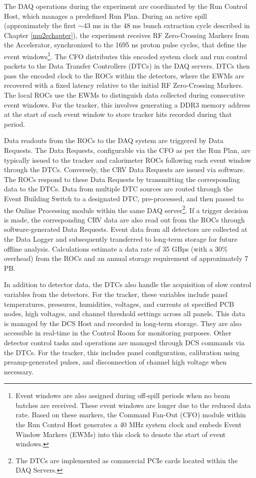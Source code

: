 The DAQ operations during the experiment are coordinated by the Run Control Host, 
which manages a predefined Run Plan. During an active spill (approximately the first $\sim$43 ms in 
the 48 ms bunch extraction cycle described in Chapter \ref{mu2echapter}), 
the experiment receives RF Zero-Crossing Markers from the Accelerator, 
synchronized to the 1695 ns proton pulse cycles, that define the event 
windows\footnote{Event windows are also assigned during off-spill periods when no beam batches are received. 
These event windows are longer due to the reduced data rate. Based on these markers, the Command Fan-Out 
(CFO) module within the Run Control Host generates a 40 MHz system clock and embeds Event Window Markers 
(EWMs) into this clock to denote the start of event windows.}. 
The CFO distributes this encoded system clock and run control packets to the 
Data Transfer Controllers (DTCs) in the DAQ servers. DTCs then pass the encoded clock to 
the ROCs within the detectors, where the EWMs are recovered with a fixed latency relative to the 
initial RF Zero-Crossing Markers. The local ROCs use the EWMs to distinguish data 
collected during consecutive event windows. For the tracker, 
this involves generating a DDR3 memory address at the start of each event 
window to store tracker hits recorded during that period.

Data readouts from the ROCs to the DAQ system are triggered by Data Requests. 
The Data Requests, configurable via the CFO as per the Run Plan, are typically 
issued to the tracker and calorimeter ROCs following each event window through 
the DTCs. Conversely, the CRV Data Requests are issued via software. The ROCs 
respond to these Data Requests by transmitting the corresponding data to the DTCs. 
Data from multiple DTC sources are routed through the Event Building Switch to 
a designated DTC, pre-processed, and then passed to the Online Processing module 
within the same DAQ server\footnote{The DTCs are implemented as commercial PCIe cards located 
within the DAQ Servers.}. If a trigger decision is made, the corresponding CRV data are also 
read out from the ROCs through software-generated Data Requests. Event data from all detectors 
are collected at the Data Logger and subsequently transferred to long-term storage for 
future offline analysis. Calculations estimate a data rate of 35 GBps (with a 30\% 
overhead) from the ROCs and an annual storage requirement of approximately 7 PB.

In addition to detector data, the DTCs also handle the acquisition of 
slow control variables from the detectors. For the tracker, these 
variables include panel temperatures, pressures, humidities, voltages, 
and currents at specified PCB nodes, high voltages, and channel threshold 
settings across all panels. This data is managed by the DCS Host and recorded 
in long-term storage. They are also accessible in real-time in the 
Control Room for monitoring purposes. Other detector control tasks 
and operations are managed through DCS commands via the DTCs. 
For the tracker, this includes panel configuration, 
calibration using preamp-generated pulses, and disconnection of channel high voltage when necessary.

